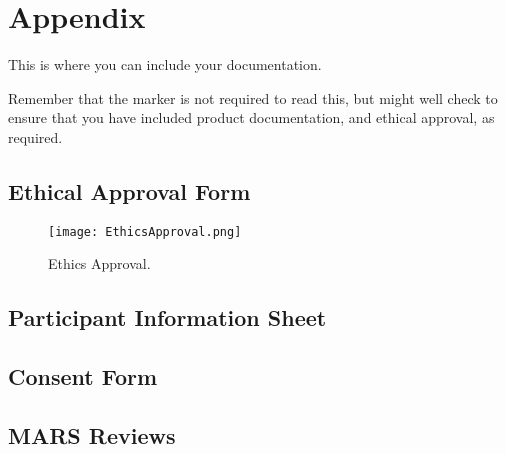 \section{Appendix}

This is where you can include your documentation.

Remember that the marker is not required to read this, but might well check to ensure that you have included product documentation, and ethical approval, as required.

\subsection{Ethical Approval Form}

\begin{figure}[h!!]
    \begin{center}
      \texttt{[image: EthicsApproval.png]}
      \caption{Ethics Approval.}
      \label{figure:ethics-approval}
    \end{center}
  \end{figure}
  
\subsection{Participant Information Sheet }


\subsection{Consent Form }


\subsection{MARS Reviews}








\clearpage


 

